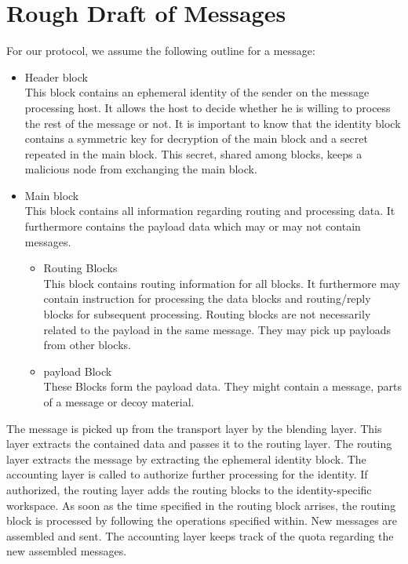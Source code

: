 \section{Rough Draft of Messages}
For our protocol, we assume the following outline for a message:
\begin{itemize}
	\item Header block\\ 
	      This block contains an ephemeral identity of the sender on the message processing host. It allows the host to decide whether he is willing to process the rest of the message or not. It is important to know that the identity block contains a symmetric key for decryption of the main block and a secret repeated in the main block. This secret, shared among blocks, keeps a malicious node from exchanging the main block.
	\item Main block\\
	      This block contains all information regarding routing and processing data. It furthermore contains the payload data which may or may not contain messages.
  	      \begin{itemize}
		    \item Routing Blocks\\
		          This block contains routing information for all blocks. It furthermore may contain instruction for processing the data blocks and routing/reply blocks for subsequent processing. Routing blocks are not necessarily related to the payload in the same message. They may pick up payloads from other blocks.
		    \item payload Block\\
		          These Blocks form the payload data. They might contain a message, parts of a message or decoy material.
	      \end{itemize}      
\end{itemize}

The message is picked up from the transport layer by the blending layer. This layer extracts the contained data and passes it to the routing layer. The routing layer extracts the message by extracting the ephemeral identity block. The accounting layer is called to authorize further processing for the identity. If authorized, the routing layer adds the routing blocks to the identity-specific workspace. As soon as the time specified in the routing block arrises, the routing block is processed by following the operations specified within. New messages are assembled and sent. The accounting layer keeps track of the quota regarding the new assembled messages. 

